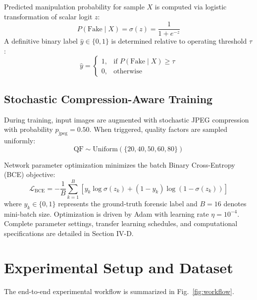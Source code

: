 \documentclass[conference]{IEEEtran}
\begin{document}
Predicted manipulation probability for sample $X$ is computed via logistic transformation of scalar logit $z$:
\begin{equation}
P(\text{Fake} \mid X) = \sigma(z) = \frac{1}{1 + e^{-z}}
\end{equation}
A definitive binary label $\hat{y} \in \{0, 1\}$ is determined relative to operating threshold $\tau$:
\begin{equation}
\hat{y} = \begin{cases} 1, & \text{if } P(\text{Fake} \mid X) \ge \tau \\ 0, & \text{otherwise} \end{cases}
\end{equation}

\subsection{Stochastic Compression-Aware Training}
During training, input images are augmented with stochastic JPEG compression with probability $p_{\text{jpeg}} = 0.50$. When triggered, quality factors are sampled uniformly:
\begin{equation}
\text{QF} \sim \text{Uniform}(\{20, 40, 50, 60, 80\})
\end{equation}

Network parameter optimization minimizes the batch Binary Cross-Entropy (BCE) objective:
\begin{equation}
\mathcal{L}_{\text{BCE}} = - \frac{1}{B} \sum_{k=1}^{B} \left[ y_k \log \sigma(z_k) + (1 - y_k) \log (1 - \sigma(z_k)) \right]
\end{equation}
where $y_k \in \{0, 1\}$ represents the ground-truth forensic label and $B = 16$ denotes mini-batch size. Optimization is driven by Adam with learning rate $\eta = 10^{-4}$. Complete parameter settings, transfer learning schedules, and computational specifications are detailed in Section IV-D.

\section{Experimental Setup and Dataset}

The end-to-end experimental workflow is summarized in Fig.~\ref{fig:workflow}.
\end{document}
